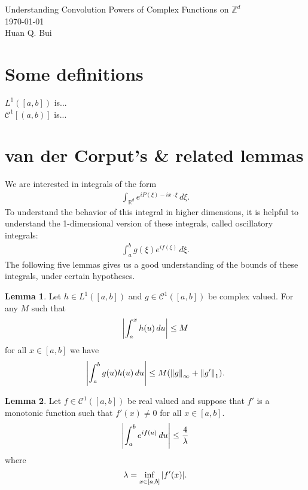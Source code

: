 \documentclass{article}
\theoremstyle{definition}
\newtheorem{lemma}{Lemma}[section]
\newcommand{\f}[2]{\frac{#1}{#2}}
\begin{document}
\begin{center}
	\huge{Understanding Convolution Powers of Complex Functions on $\mathbb{Z}^d$}\\
	$\,$\\
	\normalsize{\today}\\
	\normalsize{Huan Q. Bui}
\end{center}



\newpage

\section{Some definitions}

$L^1([a,b])$ is...\\

\noindent $\mathcal{C}^1[(a,b)]$ is...\\




\section{van der Corput's \& related lemmas}
We are interested in integrals of the form
\begin{align}
\int_{\mathbb{R}^d} e^{iP(\xi) - ix\cdot \xi}\,d\xi.
\end{align}
To understand the behavior of this integral in higher dimensions, it is helpful to understand the 1-dimensional version of these integrals, called oscillatory integrals:
\begin{align}
\int_a^b g(\xi)e^{if(\xi)}\,d\xi.
\end{align}
The following five lemmas gives us a good understanding of the bounds of these integrals, under certain hypotheses.\\

\begin{lemma}
	Let $h \in L^1([a,b])$ and $g \in \mathcal{C}^1([a,b])$ be complex valued. For any $M$ such that
	\begin{align}
	\abs{\int^x_a h(u)\,du} \leq M
	\end{align}
	for all $x\in [a,b]$ we have
	\begin{align}
	\abs{\int^b_a g(u)h(u)\,du} \leq M(\norm{g}_\infty + \norm{g'}_1).
	\end{align}
\end{lemma}


\begin{lemma}
	Let $f\in \mathcal{C}^1([a,b])$ be real valued and suppose that $f'$ is a monotonic function such that $f'(x) \neq 0$ for all $x\in [a,b]$. 
	\begin{align}
	\abs{\int^b_a e^{if(u)}\,du} \leq \f{4}{\lambda}
	\end{align}
	where
	\begin{align}
	\lambda = \inf_{x\in [a,b]}\abs{f'(x)}.
	\end{align}
\end{lemma}
\end{document}
